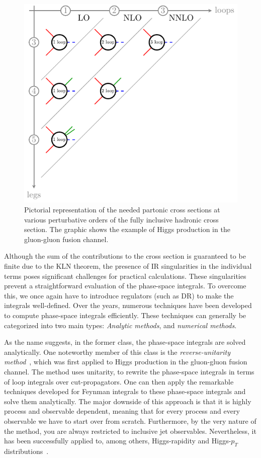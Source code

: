 \begin{figure}[ht]
\centering
\includegraphics[width=12cm]{Images/loops_and_legs.pdf}
\caption{Pictorial representation of the needed partonic cross sections at various perturbative orders of the fully inclusive hadronic cross section. The graphic shows the example of Higgs production in the gluon-gluon fusion channel.}
\label{fig:2:loops_and_legs}
\end{figure}

Although the sum of the contributions to the cross section is guaranteed to be finite due to the KLN theorem, the presence of IR singularities in the individual terms poses significant challenges for practical calculations. These singularities prevent a straightforward evaluation of the phase-space integrals. To overcome this, we once again have to introduce regulators (such as \acs{DR}) to make the integrals well-defined. Over the years, numerous techniques have been developed to compute phase-space integrals efficiently. These techniques can generally be categorized into two main types: \textit{Analytic methods}, and \textit{numerical methods}.

As the name suggests, in the former class, the phase-space integrals are solved analytically. One noteworthy member of this class is the \textit{reverse-unitarity method}~\cite{Anastasiou:2002yz}, which was first applied to Higgs production in the gluon-gluon fusion channel. The method uses unitarity, to rewrite the phase-space integrals in terms of loop integrals over cut-propagators. One can then apply the remarkable techniques developed for Feynman integrals to these phase-space integrals and solve them analytically. The major downside of this approach is that it is highly process and observable dependent, meaning that for every process and every observable we have to start over from scratch. Furthermore, by the very nature of the method, you are always restricted to inclusive jet observables. Nevertheless, it has been successfully applied to, among others, Higgs-rapidity and Higgs-$p_T$ distributions~\cite{Dulat:2017brz}.

